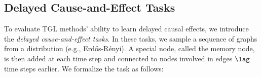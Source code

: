 

\subsection{Delayed Cause-and-Effect Tasks}
 To evaluate TGL methods' ability to learn delayed causal effects, we introduce the \emph{delayed cause-and-effect tasks}. In these tasks, we sample a sequence of graphs from a distribution (e.g., Erd\H{o}s-Rényi). A special node, called the memory node, is then added at each time step and connected to nodes involved in edges \(\lag\) time steps earlier. We formalize the task as follows:

